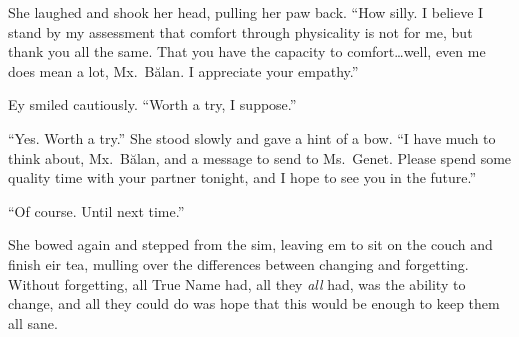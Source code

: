 She laughed and shook her head, pulling her paw back. ``How silly. I believe I stand by my assessment that comfort through physicality is not for me, but thank you all the same. That you have the capacity to comfort\ldots{}well, even me does mean a lot, Mx.~Bălan. I appreciate your empathy.''

Ey smiled cautiously. ``Worth a try, I suppose.''

``Yes. Worth a try.'' She stood slowly and gave a hint of a bow. ``I have much to think about, Mx.~Bălan, and a message to send to Ms.~Genet. Please spend some quality time with your partner tonight, and I hope to see you in the future.''

``Of course. Until next time.''

She bowed again and stepped from the sim, leaving em to sit on the couch and finish eir tea, mulling over the differences between changing and forgetting. Without forgetting, all True Name had, all they \emph{all} had, was the ability to change, and all they could do was hope that this would be enough to keep them all sane.
